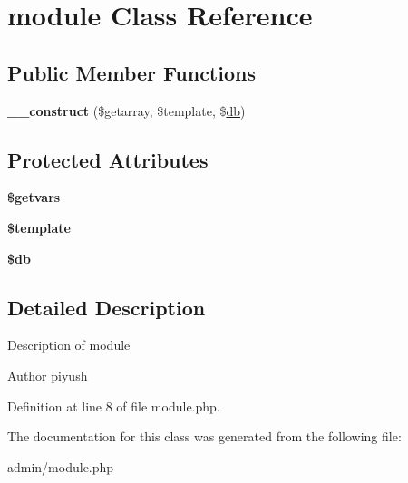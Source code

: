 \hypertarget{classmodule}{\section{module Class Reference}
\label{classmodule}
}
\subsection*{Public Member Functions}
\begin{DoxyCompactItemize}
\item 
\hypertarget{classmodule_ab057dc4f65b592345dffb5de10e24027}{{\bfseries \-\_\-\-\_\-construct} (\$getarray, \$template, \$\hyperlink{classdb}{db})}\label{classmodule_ab057dc4f65b592345dffb5de10e24027}

\end{DoxyCompactItemize}
\subsection*{Protected Attributes}
\begin{DoxyCompactItemize}
\item 
\hypertarget{classmodule_af7b7b336d419f89e3eeb89c41eec77f8}{{\bfseries \$getvars}}\label{classmodule_af7b7b336d419f89e3eeb89c41eec77f8}

\item 
\hypertarget{classmodule_a9ebd6fe2f161764e0f9946999b10d33d}{{\bfseries \$template}}\label{classmodule_a9ebd6fe2f161764e0f9946999b10d33d}

\item 
\hypertarget{classmodule_a56afb8b18363105cd10edb7c74749e50}{{\bfseries \$db}}\label{classmodule_a56afb8b18363105cd10edb7c74749e50}

\end{DoxyCompactItemize}


\subsection{Detailed Description}
Description of module

\begin{DoxyAuthor}{Author}
piyush 
\end{DoxyAuthor}


Definition at line 8 of file module.\-php.



The documentation for this class was generated from the following file\-:\begin{DoxyCompactItemize}
\item 
admin/module.\-php\end{DoxyCompactItemize}

